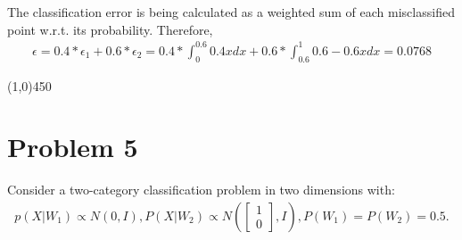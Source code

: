 \documentclass[12pt]{article}
\newcommand{\svector}[2]{\left[ \begin{matrix} #1 \\ #2 \end{matrix}\right]}
\begin{document}
\begin{enumerate}
The classification error is being calculated as a weighted sum of each misclassified point w.r.t. its probability. Therefore,
\begin{align*}
\epsilon = 0.4 * \epsilon_1 + 0.6 * \epsilon_2 = 0.4 * \int_0^0.6 0.4x dx + 0.6 * \int_0.6^1 0.6-0.6x dx = 0.0768
\end{align*}

\end{enumerate}

\begin{center}
\line(1,0){450}
\end{center}

\section{Problem 5}
Consider a two-category classification problem in two dimensions with:
\begin{align*}
p (X | W_1) \propto N ( 0 , I ), P ( X | W_2 ) \propto N (\svector{1}{0}, I) , P ( W_1 ) = P ( W_2 ) = 0.5 .
\end{align*}
\end{document}
